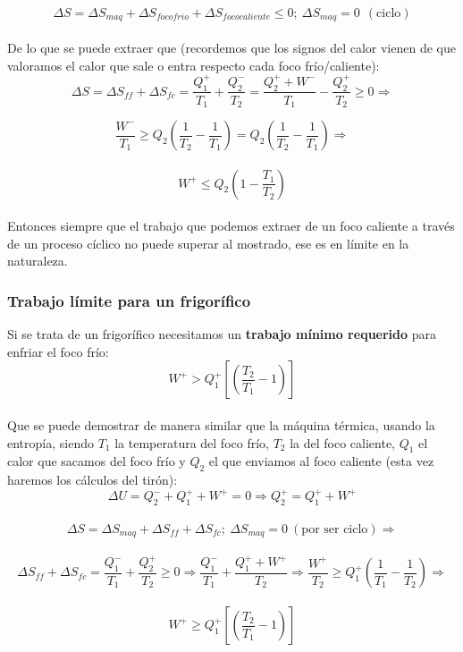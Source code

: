 \documentclass[12pt,a4paper]{article}
\newcommand{\parentesis}[1]{\left( #1 \right)}
\begin{document}
$$ \Delta S  = \Delta S_{maq}+ \Delta S_{foco frio} + \Delta S_{foco caliente} \leq 0; \ \Delta S_{maq} = 0 \ \ (\text{ciclo}) $$ \\

De lo que se puede extraer que (recordemos que los signos del calor vienen de que valoramos el calor que sale o entra respecto cada foco frío/caliente): \\

$$ \Delta S = \Delta S_{ff} + \Delta S_{fc} = \dfrac{Q_1^+}{T_1} + \dfrac{Q_2^-}{T_2} = \dfrac{Q_2^+ + W^-}{T_1} - \dfrac{Q_2^+}{T_2} \geq 0  \Longrightarrow $$

$$ \dfrac{W^-}{T_1} \geq Q_2 \parentesis{\dfrac{1}{T_2}-\dfrac{1}{T_1}} = Q_2 \parentesis{\dfrac{1}{T_2}-\dfrac{1}{T_1}} \Longrightarrow $$  \\

$$  W^+ \leq  Q_2 \parentesis{1-\dfrac{T_1}{T_2}}$$ \\

Entonces siempre que el trabajo que podemos extraer de un foco caliente a través de un proceso cíclico no puede superar al mostrado, ese es en límite en la naturaleza. \\

\subsubsection{Trabajo límite para un frigorífico}

Si se trata de un frigorífico necesitamos un \textbf{trabajo mínimo requerido} para enfriar el foco frío: \\

\begin{equation}
W^+ > Q_1^+ \left[ \parentesis{\frac{T_2}{T_1}-1} \right]
\end{equation}  \\

Que se puede demostrar de manera similar que la máquina térmica, usando la entropía, siendo $T_1$ la temperatura del foco frío, $T_2$ la del foco caliente, $Q_1$ el calor que sacamos del foco frío y $Q_2$ el que enviamos al foco caliente (esta vez haremos los cálculos del tirón): \\

$$ \Delta U = Q_2^- + Q_1^+ + W^+ = 0 \Longrightarrow Q_2^+ = Q_1^+ + W^+ $$ \\
$$ \Delta S = \Delta S_{maq} + \Delta S_{ff} + \Delta S_{fc}; \ \Delta S_{maq } = 0 \ (\text{por ser ciclo}) \Longrightarrow $$ \\
$$ \Delta S_{ff} + \Delta S_{fc} = \dfrac{Q_1^-}{T_1} + \dfrac{Q_2^+}{T_2} \geq 0 \Longrightarrow  \dfrac{Q_1^-}{T_1} + \dfrac{Q_1^+ + W^+}{T_2} \Longrightarrow \dfrac{W^+}{T_2} \geq Q_1^+ \parentesis{\dfrac{1}{T_1}-\dfrac{1}{T_2}} \Longrightarrow $$ \\
$$  W^+ \geq Q_1^+ \left[ \parentesis{\dfrac{T_2}{T_1} - 1} \right] $$ \\
\end{document}
